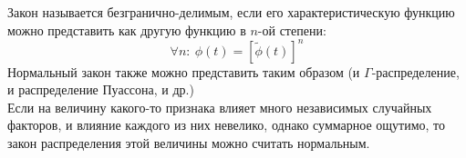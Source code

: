 Закон называется безгранично-делимым, если его характеристическую функцию можно представить как другую функцию в $n$-ой степени:
\[
	\forall n : \ \phi(t) = \left[ \widetilde{\phi} (t) \right]^n
\]
Нормальный закон также можно представить таким образом (и $\Gamma$-распределение, и распределение Пуассона, и др.) \\

Если на величину какого-то признака влияет много независимых случайных факторов, и влияние каждого из них невелико, однако суммарное ощутимо, то закон распределения этой величины можно считать нормальным.



